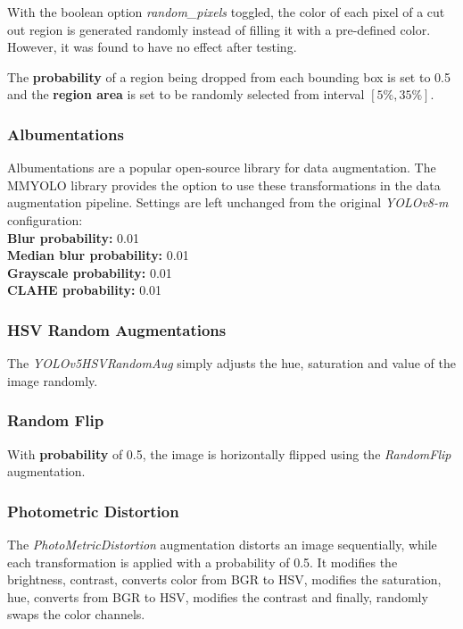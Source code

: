 With the boolean option \textit{random\_pixels} toggled, the color of each pixel
of a cut out region is generated randomly instead of filling it with a
pre-defined color. However, it was found to have no effect after testing.

The \textbf{probability} of a region being dropped from each bounding box is set
to 0.5 and the \textbf{region area} is set to be randomly selected from
interval $[5\%, 35\%]$.

\subsubsection*{Albumentations}

Albumentations\cite{Albumentations} are a popular open-source library for data
augmentation. The MMYOLO  library provides the option
to use these transformations in the data augmentation pipeline. Settings are left unchanged from the original 
\textit{YOLOv8-m} configuration: \\
\textbf{Blur probability:} 0.01 \\
\textbf{Median blur probability:} 0.01 \\
\textbf{Grayscale probability:} 0.01 \\
\textbf{CLAHE probability:} 0.01

\subsubsection*{HSV Random Augmentations}

The \textit{YOLOv5HSVRandomAug} simply adjusts the hue, saturation and value of
the image randomly.

\subsubsection*{Random Flip}

With \textbf{probability} of 0.5, the image is horizontally flipped using the
\textit{RandomFlip} augmentation.

\subsubsection*{Photometric Distortion}

The \textit{PhotoMetricDistortion} augmentation distorts an image sequentially,
while each transformation is applied with a probability of 0.5. It modifies the
brightness, contrast, converts color from BGR to HSV, modifies the saturation,
hue, converts from BGR to HSV, modifies the contrast and finally, randomly swaps
the color channels.

